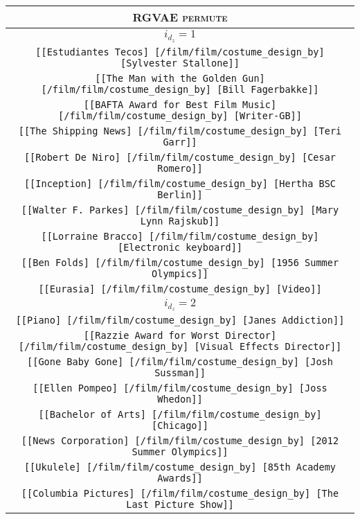 \begin{longtable}{|c|}
    \hline
    \rowcolor[HTML]{EFEFEF} 
    \textsc{RGVAE permute}\\ \hline
    \rowcolor[HTML]{EFEFEF} 
    \textsc{$i_{d_z}=1$}\\ \hline
    \texttt{[[Estudiantes Tecos] [/film/film/costume\_design\_by] [Sylvester Stallone]]}\\
    \texttt{[[The Man with the Golden Gun] [/film/film/costume\_design\_by] [Bill Fagerbakke]]}\\
    \texttt{[[BAFTA Award for Best Film Music] [/film/film/costume\_design\_by] [Writer-GB]]}\\
    \texttt{[[The Shipping News] [/film/film/costume\_design\_by] [Teri Garr]]}\\
    \texttt{[[Robert De Niro] [/film/film/costume\_design\_by] [Cesar Romero]]}\\
    \texttt{[[Inception] [/film/film/costume\_design\_by] [Hertha BSC Berlin]]}\\
    \texttt{[[Walter F. Parkes] [/film/film/costume\_design\_by] [Mary Lynn Rajskub]]}\\
    \texttt{[[Lorraine Bracco] [/film/film/costume\_design\_by] [Electronic keyboard]]}\\
    \texttt{[[Ben Folds] [/film/film/costume\_design\_by] [1956 Summer Olympics]]}\\
    \texttt{[[Eurasia] [/film/film/costume\_design\_by] [Video]]}\\ \hline
    \rowcolor[HTML]{EFEFEF} 
    \textsc{$i_{d_z}=2$}\\ \hline
    \texttt{[[Piano] [/film/film/costume\_design\_by] [Janes Addiction]]}\\
    \texttt{[[Razzie Award for Worst Director] [/film/film/costume\_design\_by] [Visual Effects Director]]}\\
    \texttt{[[Gone Baby Gone] [/film/film/costume\_design\_by] [Josh Sussman]]}\\
    \texttt{[[Ellen Pompeo] [/film/film/costume\_design\_by] [Joss Whedon]]}\\
    \texttt{[[Bachelor of Arts] [/film/film/costume\_design\_by] [Chicago]]}\\
    \texttt{[[News Corporation] [/film/film/costume\_design\_by] [2012 Summer Olympics]]}\\
    \texttt{[[Ukulele] [/film/film/costume\_design\_by] [85th Academy Awards]]}\\
    \texttt{[[Columbia Pictures] [/film/film/costume\_design\_by] [The Last Picture Show]]}\\

\end{longtable}
